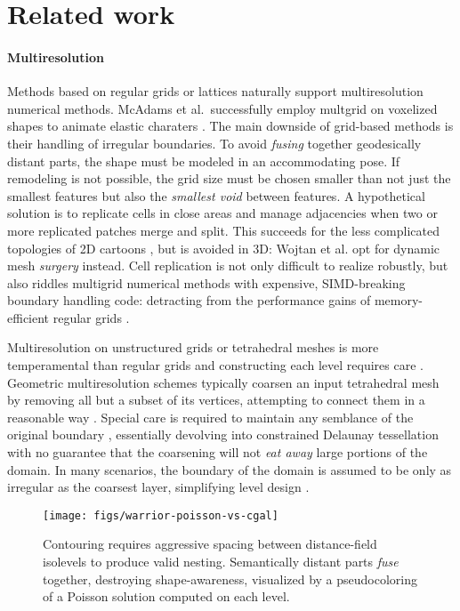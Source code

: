 
\section{Related work}
\label{sec:related}


\paragraph{Multiresolution}
%
Methods based on regular grids or lattices naturally support multiresolution numerical methods.
%
McAdams et al.\ successfully employ multgrid on voxelized shapes to animate
elastic charaters .
%
The main downside of grid-based methods is their handling of irregular
boundaries.
%
To avoid \emph{fusing} together geodesically distant parts, the
shape must be modeled in an accommodating pose. If remodeling is not
possible, the grid size must be chosen smaller than not just the smallest
features but also the \emph{smallest void} between features.
%
A hypothetical solution is to replicate cells in close areas and manage
adjacencies when two or more replicated patches merge and split.
%
This succeeds for the less complicated topologies of 2D cartoons
\cite{Sykora09}, but is avoided in 3D: Wojtan et al.
 opt for dynamic mesh \emph{surgery} instead.
%
Cell replication is not only difficult to realize robustly, but also riddles
multigrid numerical methods with expensive, SIMD-breaking boundary handling
code: detracting from the performance gains of memory-efficient regular grids
\cite{Demmel04}.

Multiresolution on unstructured grids or tetrahedral meshes is more
temperamental than regular grids and constructing each level requires care
\cite{fish1995efficient}.
%
Geometric multiresolution schemes typically coarsen an input tetrahedral mesh
by removing all but a subset of its vertices, attempting to connect them in a
reasonable way \cite{guillard1993,Adams:1999:PMS}. Special care is required to
maintain any semblance of the original boundary \cite{Brune:2011}, essentially
devolving into constrained Delaunay tessellation with no guarantee that the
coarsening will not \emph{eat away} large portions of the domain.
%
In many scenarios, the boundary of the domain is assumed to be only as
irregular as the coarsest layer, simplifying level design \cite{feng1997non}.

\begin{figure}[b]
  \texttt{[image: figs/warrior-poisson-vs-cgal]}
  \caption{Contouring requires aggressive spacing between distance-field
  isolevels to produce valid nesting. Semantically distant parts \emph{fuse}
  together, destroying shape-awareness, visualized by a pseudocoloring of a
  Poisson solution computed on each level.} 
  \label{fig:warrior-poisson}
\end{figure}

